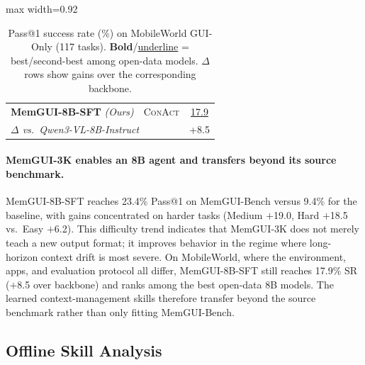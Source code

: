 \documentclass{llmxive}
\providecommand{\llmname}[1]{{\fontfamily{pcr}\selectfont{#1}}}
\providecommand{\conact}{\textsc{ConAct}\xspace}
\providecommand{\rise}[1]{#1}
\begin{document}
\begin{table}[!htbp]
\begin{adjustbox}{max width=0.92\linewidth}
\begin{tabular}{@{}l l c@{}}
    \addlinespace[2pt]
    \rowcolor{oursrowcolor} \textbf{MemGUI-8B-SFT} \textit{(Ours)} & \conact & \underline{17.9} \\
    \multicolumn{2}{l}{\quad\textit{\footnotesize $\Delta$ vs.\ Qwen3-VL-8B-Instruct}} & {\footnotesize\rise{+8.5}} \\
    \bottomrule
  \end{tabular}%
  \end{adjustbox}
  \vspace{-2mm}
  \caption{Pass@1 success rate (\%) on MobileWorld GUI-Only (117 tasks). \textbf{Bold}/\underline{underline} = best/second-best among open-data models. $\Delta$ rows show gains over the corresponding \llmname{Qwen3-VL} backbone.}
  \label{tab:mobileworld-results}
\end{table}


\paragraph{MemGUI-3K enables an 8B agent and transfers beyond its source benchmark.}
MemGUI-8B-SFT reaches 23.4\% Pass@1 on MemGUI-Bench versus 9.4\% for the \llmname{Qwen3-VL-8B-Instruct} baseline, with gains concentrated on harder tasks (Medium $+$19.0, Hard $+$18.5 vs.\ Easy $+$6.2). This difficulty trend indicates that MemGUI-3K does not merely teach a new output format; it improves behavior in the regime where long-horizon context drift is most severe. On MobileWorld, where the environment, apps, and evaluation protocol all differ, MemGUI-8B-SFT still reaches 17.9\% SR ($+$8.5 over backbone) and ranks among the best open-data 8B models. The learned context-management skills therefore transfer beyond the source benchmark rather than only fitting MemGUI-Bench.

\vspace{-0.25em}
\subsection{Offline Skill Analysis}
\label{sec:offline-skill-analysis}
\vspace{-0.55em}
\end{document}
